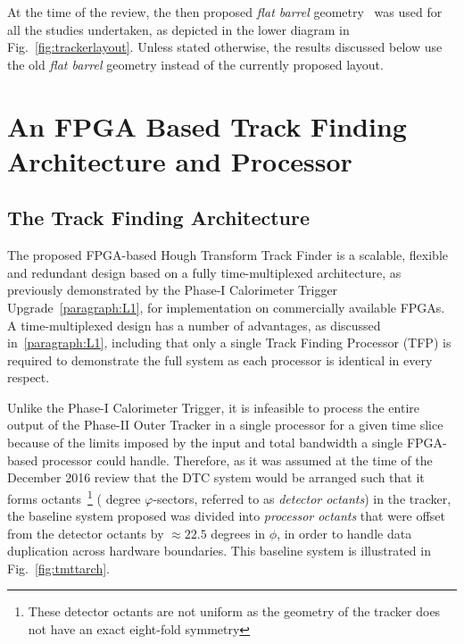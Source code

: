 At the time of the review, the then proposed \emph{flat barrel} geometry~\cite{CMS_Upgrade_TP} was used for all the studies undertaken, as depicted in the lower diagram in Fig.~\ref{fig:trackerlayout}.
Unless stated otherwise, the results discussed below use the old \emph{flat barrel} geometry instead of the currently proposed layout.

\section{An FPGA Based Track Finding Architecture and Processor}\label{sec:TMTT}
\subsection{The Track Finding Architecture}\label{subsec:TFA}
The proposed FPGA-based Hough Transform Track Finder is a scalable, flexible and redundant design based on a fully time-multiplexed architecture, as previously demonstrated by the Phase-I Calorimeter Trigger Upgrade~\ref{paragraph:L1}, for implementation on commercially available FPGAs.
A time-multiplexed design has a number of advantages, as discussed in~\ref{paragraph:L1}, including that only a single Track Finding Processor (TFP) is required to demonstrate the full system as each processor is identical in every respect.

Unlike the Phase-I Calorimeter Trigger, it is infeasible to process the entire output of the Phase-II Outer Tracker in a single processor for a given time slice because of the limits imposed by the input and total bandwidth a single FPGA-based processor could handle.
Therefore, as it was assumed at the time of the December 2016 review that the DTC system would be arranged such that it forms octants~\footnote{These detector octants are not uniform as the geometry of the tracker does not have an exact eight-fold symmetry} ( degree $\varphi$-sectors, referred to as \emph {detector octants}) in the tracker, the baseline system proposed was divided into \emph{processor octants} that were offset from the detector octants by $\approx 22.5$ degrees in $\phi$, in order to handle data duplication across hardware boundaries.
This baseline system is illustrated in Fig.~\ref{fig:tmttarch}.

